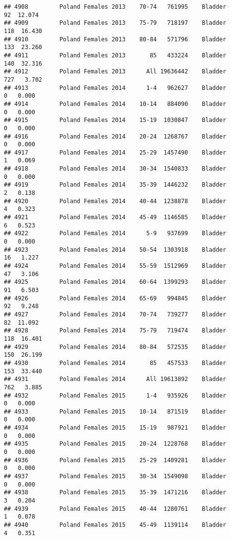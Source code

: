 \documentclass[
]{article}
\begin{document}
\begin{verbatim}
## 4908         Poland Females 2013    70-74   761995    Bladder     92  12.074
## 4909         Poland Females 2013    75-79   718197    Bladder    118  16.430
## 4910         Poland Females 2013    80-84   571796    Bladder    133  23.260
## 4911         Poland Females 2013       85   433224    Bladder    140  32.316
## 4912         Poland Females 2013      All 19636442    Bladder    727   3.702
## 4913         Poland Females 2014      1-4   962627    Bladder      0   0.000
## 4914         Poland Females 2014    10-14   884090    Bladder      0   0.000
## 4915         Poland Females 2014    15-19  1030847    Bladder      0   0.000
## 4916         Poland Females 2014    20-24  1268767    Bladder      0   0.000
## 4917         Poland Females 2014    25-29  1457490    Bladder      1   0.069
## 4918         Poland Females 2014    30-34  1540833    Bladder      0   0.000
## 4919         Poland Females 2014    35-39  1446232    Bladder      2   0.138
## 4920         Poland Females 2014    40-44  1238878    Bladder      4   0.323
## 4921         Poland Females 2014    45-49  1146585    Bladder      6   0.523
## 4922         Poland Females 2014      5-9   937699    Bladder      0   0.000
## 4923         Poland Females 2014    50-54  1303918    Bladder     16   1.227
## 4924         Poland Females 2014    55-59  1512969    Bladder     47   3.106
## 4925         Poland Females 2014    60-64  1399293    Bladder     91   6.503
## 4926         Poland Females 2014    65-69   994845    Bladder     92   9.248
## 4927         Poland Females 2014    70-74   739277    Bladder     82  11.092
## 4928         Poland Females 2014    75-79   719474    Bladder    118  16.401
## 4929         Poland Females 2014    80-84   572535    Bladder    150  26.199
## 4930         Poland Females 2014       85   457533    Bladder    153  33.440
## 4931         Poland Females 2014      All 19613892    Bladder    762   3.885
## 4932         Poland Females 2015      1-4   935926    Bladder      0   0.000
## 4933         Poland Females 2015    10-14   871519    Bladder      0   0.000
## 4934         Poland Females 2015    15-19   987921    Bladder      0   0.000
## 4935         Poland Females 2015    20-24  1228768    Bladder      0   0.000
## 4936         Poland Females 2015    25-29  1409281    Bladder      0   0.000
## 4937         Poland Females 2015    30-34  1549098    Bladder      0   0.000
## 4938         Poland Females 2015    35-39  1471216    Bladder      3   0.204
## 4939         Poland Females 2015    40-44  1280761    Bladder      1   0.078
## 4940         Poland Females 2015    45-49  1139114    Bladder      4   0.351

\end{verbatim}
\end{document}
